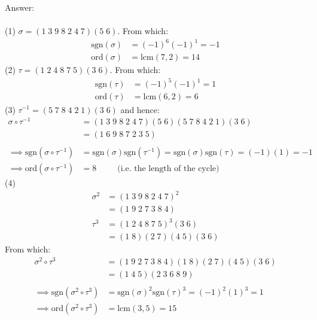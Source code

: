 \documentclass[12pt,a4paper]{article}
\begin{document}
\vspace{1cm}
\noindent
Answer:\\
\\
(1) $\sigma=(1 \; 3 \; 9 \; 8 \; 2 \; 4 \; 7)(5 \; 6)$.  From which:
\begin{align*}
  \text{sgn}(\sigma) &= (-1)^6(-1)^1=-1 \\
  \text{ord}(\sigma) &= \text{lcm}(7,2)=14
\end{align*}
(2) $\tau=(1 \; 2 \; 4 \; 8 \; 7 \; 5)(3 \; 6)$.  From which:
\begin{align*}
  \text{sgn}(\tau) &= (-1)^5(-1)^1=1 \\
  \text{ord}(\tau) &= \text{lcm}(6,2)=6
\end{align*}
(3) $\tau^{-1} = (5 \; 7 \; 8 \; 4 \; 2 \; 1)(3 \; 6)$ and hence:
\begin{align*}
  \sigma \circ \tau^{-1} &= (1 \; 3 \; 9 \; 8 \; 2 \; 4 \; 7)(5 \; 6)(5 \; 7 \; 8 \; 4 \; 2 \; 1)(3 \; 6) \\
   &= (1 \; 6 \; 9 \; 8 \; 7 \; 2 \; 3 \; 5) \\
   \\
  \implies \text{sgn}(\sigma \circ \tau^{-1}) &= \text{sgn}(\sigma)\text{sgn}(\tau^{-1}) = \text{sgn}(\sigma)\text{sgn}(\tau) = (-1)(1)=-1\\
  \implies \text{ord}(\sigma \circ \tau^{-1}) &= 8 \;\;\;\;\;\;\;\;\; \text{(i.e. the length of the cycle)}
\end{align*}
(4) 
\begin{align*}
  \sigma^2 &= (1 \; 3 \; 9 \; 8 \; 2 \; 4 \; 7)^2 \\
   &= (1 \; 9 \; 2 \; 7 \; 3 \; 8 \; 4) \\
  \tau^3 &= (1 \; 2 \; 4 \; 8 \; 7 \; 5)^3(3 \; 6) \\
  &= (1 \; 8)(2 \; 7)(4 \; 5)(3 \; 6)
\end{align*}
From which:
\begin{align*}
  \sigma^2 \circ \tau^3 &= (1 \; 9 \; 2 \; 7 \; 3 \; 8 \; 4)(1 \; 8)(2 \; 7)(4 \; 5)(3 \; 6) \\
  &= (1 \; 4 \; 5)(2 \; 3 \; 6 \; 8 \; 9) \\
  \\
  \implies \text{sgn}(\sigma^2 \circ \tau^3) &= \text{sgn}(\sigma)^2 \text{sgn}(\tau)^3 = (-1)^2(1)^3=1\\
  \implies \text{ord}(\sigma^2 \circ \tau^3) &= \text{lcm}(3, 5)=15
\end{align*}
\end{document}
